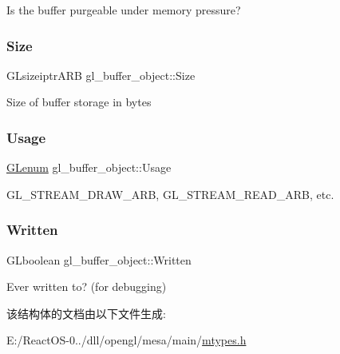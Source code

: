 Is the buffer purgeable under memory pressure? \mbox{\label{structgl__buffer__object_a471e97d10220fafccb2437b0ae2a8793}} 
\subsubsection{\texorpdfstring{Size}{Size}}
{\footnotesize\ttfamily G\+Lsizeiptr\+A\+RB gl\+\_\+buffer\+\_\+object\+::\+Size}

Size of buffer storage in bytes \mbox{\label{structgl__buffer__object_a352e4e28541f5fce5a15d37c83f5c575}} 
\subsubsection{\texorpdfstring{Usage}{Usage}}
{\footnotesize\ttfamily \hyperlink{interfacevoid}{G\+Lenum} gl\+\_\+buffer\+\_\+object\+::\+Usage}

G\+L\+\_\+\+S\+T\+R\+E\+A\+M\+\_\+\+D\+R\+A\+W\+\_\+\+A\+RB, G\+L\+\_\+\+S\+T\+R\+E\+A\+M\+\_\+\+R\+E\+A\+D\+\_\+\+A\+RB, etc. \mbox{\label{structgl__buffer__object_a8f24ec4ece728e3229290f966e3b958b}} 
\subsubsection{\texorpdfstring{Written}{Written}}
{\footnotesize\ttfamily G\+Lboolean gl\+\_\+buffer\+\_\+object\+::\+Written}

Ever written to? (for debugging) 

该结构体的文档由以下文件生成\+:\begin{DoxyCompactItemize}
\item 
E\+:/\+React\+O\+S-\/0../dll/opengl/mesa/main/\hyperlink{mtypes_8h}{mtypes.\+h}\end{DoxyCompactItemize}
